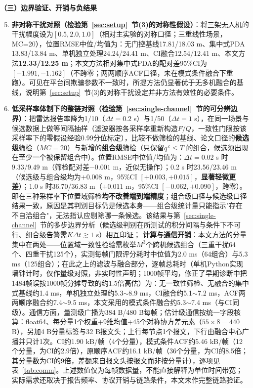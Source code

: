 \documentclass[UTF8,a4paper,zihao=-4]{ctexart}
\begin{document}
\noindent\textbf{（三）边界验证、开销与负结果}\par
\begin{enumerate}\setcounter{enumi}{4}
\item \textbf{非对称干扰对照（检验第~\ref{sec:setup}~节(3)的对称性假设）}：将三架无人机的干扰幅度设为\([0.5,2.0,1.0]\)（相对主实验的对称口径；三重线性场景，MC=20），位置RMSE中位/均值为：无门控基线17.81/18.03 m、集中式PDA 13.83/13.84 m、单机独立处理24.24/24.41 m、CI融合12.54/12.41 m、本文方法\textbf{12.33/12.25 m}；本文方法相对集中式PDA的配对差95\%CI为$[-1.991,-1.162]$（不跨零；两两顺序ACF口径，未在模式条件融合下重跑）。可见在平台间欺骗参数不一致时，所提方法仍显著优于无多机融合的基线，说明第~\ref{sec:setup}~节(3)的对称干扰设定并非方法有效性的必要条件。

\item \textbf{低采样率体制下的整链对照（检验第~\ref{sec:single-channel}~节的可分辨边界）}：把雷达报告率降为1/10（\(\Delta t=0.2\) s）与1/50（\(\Delta t=1\) s），在同一场景与候选数据上做等间隔抽样（滤波器按各采样率重新构造\(F/Q\)，一致性门限按该采样率下的零假设经验0.99分位标定），比较不做筛检的基线、论文口径的\textbf{候选级}筛检（\(MC=20\)）与新增的\textbf{组合级}筛检（只保留\(q^{\,c}\le T\) 的组合，候选须出现在至少一个被保留组合中）。位置RMSE中位值/均值为：\(\Delta t=0.02\) s 时9.33/9.49 m（筛检配对差$-0.001$ m，近似无操作）；0.2 s 时23.56/23.46 m（候选级与组合级均为$+0.008$ m，95\%CI $[+0.003,+0.015]$，\textbf{显著轻微更差}）；1.0 s 时36.70/36.83 m（$+0.011$ m，95\%CI $[-0.062,+0.090]$，跨零）。即在三种采样率下位置域筛检\textbf{均不改善端到端精度}；组合级口径与候选级口径结果一致，原因是其判别目标仍是候选本身——组合级统计量只能指示"存在不自洽组合"，无法指认应剔除哪一条候选。该结果与第~\ref{sec:single-channel}~节的多步边界分析（候选级判别在所测试的积分间隔与条件下不可行、组合级告警需\(K\Delta t\gtrsim1\) s）相互印证； \textbf{计算与通信开销}：本文方法的分量集中在两处——位置域一致性检验需枚举$M^3$个跨机候选组合（三重干扰64个、四重干扰125个），实测每帧门限评分耗时中位值为2.0 ms（64组合）与5.3 ms（125组合）；在此之上的滤波与融合部分，逐帧总耗时（单机Python实现墙钟计时，仅作量级对照，非实时性声明；1000帧平均，修正了早期诊断中把1484帧误按1000帧分摊导致的约1.5倍高估）为：无一致性筛检、无融合的集中式基线约1.4 ms，单机独立处理约5.3$\sim$8.9 ms，CI融合约5.1$\sim$7.2 ms，ACF两两顺序融合约7.4$\sim$9.5 ms，本文采用的模式条件融合约5.3$\sim$7.4 ms（与CI同级）。通信方面，量测级广播为384 B/480 B每帧；估计级通信按统一字段核算：float64、每分量1个权重+9维均值+45个对称协方差元素（\(55\times8=440\) B），另加4 B分量标签与32 B报文头；上行每节点1个报文，下行由融合中心广播并只计1次。CI约1.90 kB/帧（4个分量），模式条件ACF约5.46 kB/帧（12个分量，为CI的2.9倍），原顺序ACF约16.1 kB/帧（36个分量，为CI的8.5倍；其分量数为CI的9倍，差额来自报文头按报文而非按分量计），逐项见表~\ref{tab:comm}。上述数值仅为每帧数据量，不能直接解释为单位时间带宽；实际需求还取决于报告频率、协议开销与链路条件，本文未作完整链路验证。




\end{enumerate}
\end{document}
